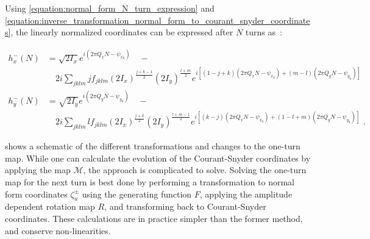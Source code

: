 Using \cref{equation:normal_form_N_turn_expression} and \cref{equation:inverse_transformation_normal_form_to_courant_snyder_coordinates}, the linearly normalized coordinates can be expressed after \(N\) turns as~\cite{CERN:Bartolini:Normal_Form_Tracking_Beam_Data}:

\begin{equation}
    \begin{aligned}
        h_x^{-}(N) & = \sqrt{2 I_x} e^{i \left( 2 \pi Q_x N - \psi_{x_0} \right)} \quad - \\
        & \quad 2 i \sum_{jklm} j f_{jklm} \left( 2 I_x \right)^{\frac{j+k-1}{2}} \left( 2 I_y \right)^{\frac{l+m}{2}}   e^{i \left[ (1-j+k) \left( 2 \pi Q_x N - \psi_{x_0} \right) + (m-l)   \left( 2 \pi Q_y N - \psi_{y_0} \right) \right]} \\
        h_y^{-}(N) & = \sqrt{2 I_y} e^{i \left( 2 \pi Q_y N - \psi_{y_0} \right)} \quad - \\
        & \quad 2 i \sum_{jklm} l f_{jklm} \left( 2 I_x \right)^{\frac{j+k}{2}}   \left( 2 I_y \right)^{\frac{l+m-1}{2}} e^{i \left[ (k-j)   \left( 2 \pi Q_x N - \psi_{x_0} \right) + (1-l+m) \left( 2 \pi Q_y N - \psi_{y_0} \right) \right]} \text{ .}
    \end{aligned}
    \label{equation:linearly_normalized_coordinates_after_N_turns}
\end{equation}

 shows a schematic of the different transformations and changes to the one-turn map.
While one can calculate the evolution of the Courant-Snyder coordinates by applying the map \( \mathcal{M} \), the approach is complicated to solve.
Solving the one-turn map for the next turn is best done by performing a transformation to normal form coordinates \(\zeta_{u}^{\pm}\) using the generating function \(F\), applying the amplitude dependent rotation map \(R\), and transforming back to Courant-Snyder coordinates.
These calculations are in practice simpler than the former method, and conserve non-linearities.

